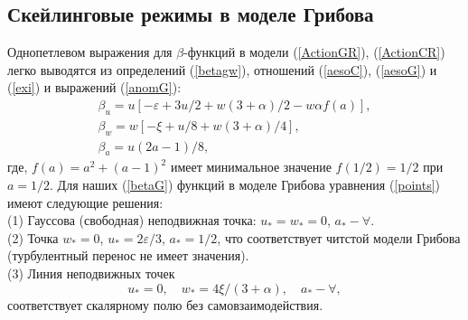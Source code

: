 \documentclass[a4paper,10pt]{article}
\begin{document}
\subsection{Скейлинговые режимы в моделе Грибова} \label{sec:GPS}
Однопетлевом выражения для $\beta$-функций в модели (\ref{ActionGR}), (\ref{ActionCR}) легко выводятся из определений (\ref{betagw}), отношений (\ref{aesoC}), (\ref{aesoG}) и (\ref{exi}) и
выражений (\ref{anomG}): 
\begin{eqnarray}
\beta_{u} = u \left[ -\varepsilon+ 3u/2 + w(3+\alpha)/2 -w\alpha f(a) \right],
\nonumber \\
\beta_{w} = w \left[ -\xi +u/8 + w(3+\alpha)/4 \right],
\nonumber \\
\beta_{a} = u(2a-1)/8,
\label{betaG}
\end{eqnarray}
где, $f(a)=a^{2}+(a-1)^{2}$  имеет минимальное значение $f(1/2) =1/2$ при $a=1/2$. Для наших (\ref{betaG}) функций в моделе Грибова уравнения
(\ref{points}) имеют следующие решения:\\

(1)  Гауссова  (свободная) неподвижная точка: $u_{*}=w_{*}=0$, $a_{*}-\forall$.\\

(2) Точка  $w_{*}=0$, $u_{*}=2\varepsilon/3$, $a_{*}=1/2$, что соответствует читстой модели Грибова 
(турбулентный перенос не имеет значения).\\

(3) Линия неподвижных точек
\begin{equation}
u_{*}=0, \quad w_{*}=4\xi/(3+\alpha), \quad  a_{*} - \forall,
\label{line3}
\end{equation}
соответствует  скалярному полю без самовзаимодействия.\\
\end{document}
